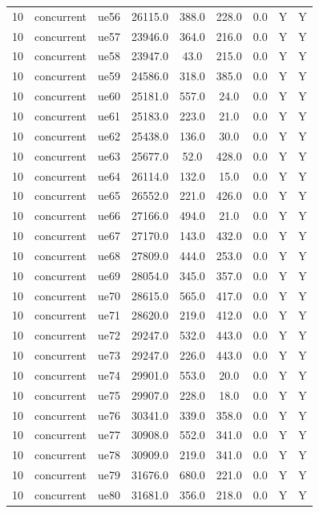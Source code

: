 \begin{table}[ht]
\begin{tabular}{|c|c|c|c|c|c|c|c|c|}
10 & concurrent & ue56 & 26115.0 & 388.0 & 228.0 & 0.0 & Y & Y \\
10 & concurrent & ue57 & 23946.0 & 364.0 & 216.0 & 0.0 & Y & Y \\
10 & concurrent & ue58 & 23947.0 & 43.0 & 215.0 & 0.0 & Y & Y \\
10 & concurrent & ue59 & 24586.0 & 318.0 & 385.0 & 0.0 & Y & Y \\
10 & concurrent & ue60 & 25181.0 & 557.0 & 24.0 & 0.0 & Y & Y \\
10 & concurrent & ue61 & 25183.0 & 223.0 & 21.0 & 0.0 & Y & Y \\
10 & concurrent & ue62 & 25438.0 & 136.0 & 30.0 & 0.0 & Y & Y \\
10 & concurrent & ue63 & 25677.0 & 52.0 & 428.0 & 0.0 & Y & Y \\
10 & concurrent & ue64 & 26114.0 & 132.0 & 15.0 & 0.0 & Y & Y \\
10 & concurrent & ue65 & 26552.0 & 221.0 & 426.0 & 0.0 & Y & Y \\
10 & concurrent & ue66 & 27166.0 & 494.0 & 21.0 & 0.0 & Y & Y \\
10 & concurrent & ue67 & 27170.0 & 143.0 & 432.0 & 0.0 & Y & Y \\
10 & concurrent & ue68 & 27809.0 & 444.0 & 253.0 & 0.0 & Y & Y \\
10 & concurrent & ue69 & 28054.0 & 345.0 & 357.0 & 0.0 & Y & Y \\
10 & concurrent & ue70 & 28615.0 & 565.0 & 417.0 & 0.0 & Y & Y \\
10 & concurrent & ue71 & 28620.0 & 219.0 & 412.0 & 0.0 & Y & Y \\
10 & concurrent & ue72 & 29247.0 & 532.0 & 443.0 & 0.0 & Y & Y \\
10 & concurrent & ue73 & 29247.0 & 226.0 & 443.0 & 0.0 & Y & Y \\
10 & concurrent & ue74 & 29901.0 & 553.0 & 20.0 & 0.0 & Y & Y \\
10 & concurrent & ue75 & 29907.0 & 228.0 & 18.0 & 0.0 & Y & Y \\
10 & concurrent & ue76 & 30341.0 & 339.0 & 358.0 & 0.0 & Y & Y \\
10 & concurrent & ue77 & 30908.0 & 552.0 & 341.0 & 0.0 & Y & Y \\
10 & concurrent & ue78 & 30909.0 & 219.0 & 341.0 & 0.0 & Y & Y \\
10 & concurrent & ue79 & 31676.0 & 680.0 & 221.0 & 0.0 & Y & Y \\
10 & concurrent & ue80 & 31681.0 & 356.0 & 218.0 & 0.0 & Y & Y \\

\end{tabular}
\end{table}
